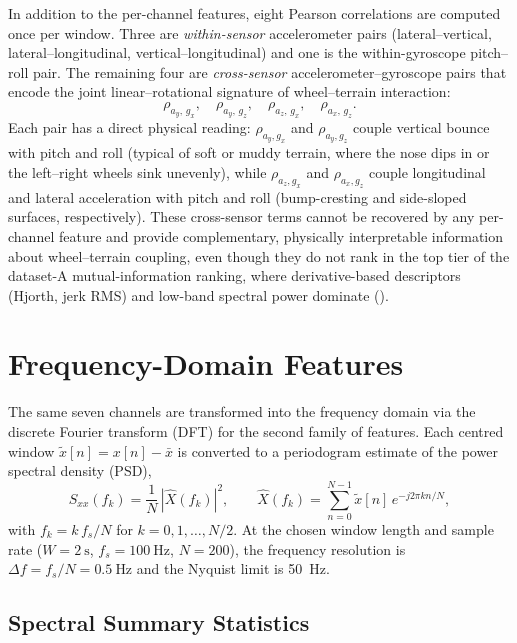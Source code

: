 In addition to the per-channel features, eight Pearson correlations are computed once per window. Three are \emph{within-sensor} accelerometer pairs (lateral--vertical, lateral--longitudinal, vertical--longitudinal) and one is the within-gyroscope pitch--roll pair. The remaining four are \emph{cross-sensor} accelerometer--gyroscope pairs that encode the joint linear--rotational signature of wheel--terrain interaction:
\begin{equation}
    \rho_{a_y,\,g_x},\quad
    \rho_{a_y,\,g_z},\quad
    \rho_{a_z,\,g_x},\quad
    \rho_{a_x,\,g_z}.
    \label{eq:cross_corrs}
\end{equation}
Each pair has a direct physical reading: $\rho_{a_y,g_x}$ and $\rho_{a_y,g_z}$ couple vertical bounce with pitch and roll (typical of soft or muddy terrain, where the nose dips in or the left--right wheels sink unevenly), while $\rho_{a_z,g_x}$ and $\rho_{a_x,g_z}$ couple longitudinal and lateral acceleration with pitch and roll (bump-cresting and side-sloped surfaces, respectively). These cross-sensor terms cannot be recovered by any per-channel feature and provide complementary, physically interpretable information about wheel--terrain coupling, even though they do not rank in the top tier of the dataset-A mutual-information ranking, where derivative-based descriptors (Hjorth, jerk RMS) and low-band spectral power dominate ().

\section{Frequency-Domain Features}
\label{sec:feat_freq}

The same seven channels are transformed into the frequency domain via the discrete Fourier transform (DFT) for the second family of features. Each centred window $\tilde x[n] = x[n] - \bar x$ is converted to a periodogram estimate of the power spectral density (PSD),
\begin{equation}
    S_{xx}(f_k) = \frac{1}{N}\,|\hat{X}(f_k)|^{2},
    \qquad
    \hat{X}(f_k) = \sum_{n=0}^{N-1} \tilde x[n]\,e^{-j 2\pi k n / N},
    \label{eq:psd}
\end{equation}
with $f_k = k\,f_s / N$ for $k = 0, 1, \dots, N/2$. At the chosen window length and sample rate ($W = \SI{2}{\second}$, $f_s = \SI{100}{\hertz}$, $N=200$), the frequency resolution is $\Delta f = f_s/N = \SI{0.5}{\hertz}$ and the Nyquist limit is \SI{50}{\hertz}.

\subsection{Spectral Summary Statistics}


